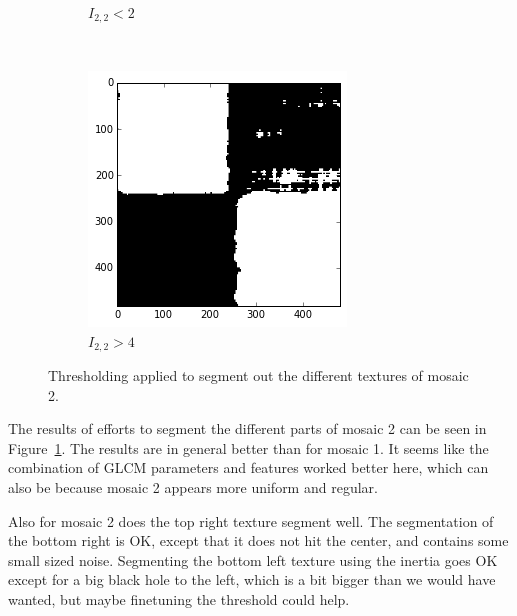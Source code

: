 \documentclass[a4paper]{article}
\begin{document}
\begin{figure}
\begin{subfigure}[b]{0.23\textwidth}
        \caption{%
            $I_{2,2} < 2$
        }
    \end{subfigure}
    ~
    \begin{subfigure}[b]{0.23\textwidth}
        \centering
        \includegraphics[width=\textwidth]{segm_2_i22_hi.png}
        \caption{%
            $I_{2,2} > 4$
        }
    \end{subfigure}
    \caption{%
        Thresholding applied to segment out the different textures of
        mosaic 2.
    }
    \label{fig:m2_segm}
\end{figure}
\appendix

The results of efforts to segment the different parts of mosaic 2 can be
seen in Figure~\ref{fig:m2_segm}. The results are in general better than
for mosaic 1. It seems like the combination of GLCM parameters and
features worked better here, which can also be because mosaic 2 appears
more uniform and regular.

Also for mosaic 2 does the top right texture segment well. The
segmentation of the bottom right is OK, except that it does not hit the
center, and contains some small sized noise. Segmenting the bottom left
texture using the inertia goes OK except for a big black hole to the
left, which is a bit bigger than we would have wanted, but maybe
finetuning the threshold could help.
\end{document}
